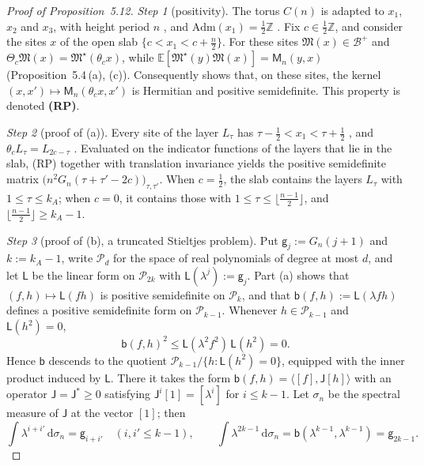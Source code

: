 \documentclass[11pt]{amsart}
\theoremstyle{definition}
\begin{document}
\begin{proof}[Proof of Proposition~5.12]
\emph{Step 1} (positivity).
The torus $C(n)$ is adapted to $x_1$, $x_2$ and $x_3$, with height period $n$ \cite[Section~1.1]{QEDII}, and $\mathrm{Adm}(x_1)=\frac12\mathbb Z$ \cite[Definition~2.2]{QEDII}.
Fix $c\in\frac12\mathbb Z$, and consider the sites $x$ of the open slab $\{c<x_1<c+\frac n2\}$.
For these sites $\mathfrak M(x)\in\mathcal B^+$ and $\Theta_c\mathfrak M(x)=\mathfrak M^\star(\theta_cx)$, while $\mathbb E[\mathfrak M^\star(y)\mathfrak M(x)]=\mathsf M_n(y,x)$ (Proposition~5.4\,(a), (c)).
Consequently \cite[Theorem~1.1\,(c)]{QEDII} shows that, on these sites, the kernel $(x,x')\mapsto\mathsf M_n(\theta_cx,x')$ is Hermitian and positive semidefinite.
This property is denoted \textbf{(RP)}.

\emph{Step 2} (proof of (a)).
Every site of the layer $L_\tau$ has $\tau-\frac12<x_1<\tau+\frac12$ \cite[Definition~2.4]{QEDII}, and $\theta_cL_\tau=L_{2c-\tau}$ \cite[Proposition~3.6\,(c)]{QEDII}.
Evaluated on the indicator functions of the layers that lie in the slab, (RP) together with translation invariance yields the positive semidefinite matrix $\bigl(n^2G_n(\tau+\tau'-2c)\bigr)_{\tau,\tau'}$.
When $c=\frac12$, the slab contains the layers $L_\tau$ with $1\le\tau\le k_A$; when $c=0$, it contains those with $1\le\tau\le\lfloor\frac{n-1}2\rfloor$, and $\lfloor\frac{n-1}2\rfloor\ge k_A-1$.

\emph{Step 3} (proof of (b), a truncated Stieltjes problem).
Put $\mathsf g_j:=G_n(j+1)$ and $k:=k_A-1$, write $\mathcal P_d$ for the space of real polynomials of degree at most $d$, and let $\mathsf L$ be the linear form on $\mathcal P_{2k}$ with $\mathsf L(\lambda^j):=\mathsf g_j$.
Part (a) shows that $(f,h)\mapsto\mathsf L(fh)$ is positive semidefinite on $\mathcal P_k$, and that $\mathsf b(f,h):=\mathsf L(\lambda fh)$ defines a positive semidefinite form on $\mathcal P_{k-1}$.
Whenever $h\in\mathcal P_{k-1}$ and $\mathsf L(h^2)=0$,
\begin{equation*}
\mathsf b(f,h)^2\le\mathsf L(\lambda^2f^2)\,\mathsf L(h^2)=0.
\end{equation*}
Hence $\mathsf b$ descends to the quotient $\mathcal P_{k-1}/\{h:\mathsf L(h^2)=0\}$, equipped with the inner product induced by $\mathsf L$.
There it takes the form $\mathsf b(f,h)=\langle[f],\mathsf J[h]\rangle$ with an operator $\mathsf J=\mathsf J^*\ge0$ satisfying $\mathsf J^i[1]=[\lambda^i]$ for $i\le k-1$.
Let $\sigma_n$ be the spectral measure of $\mathsf J$ at the vector $[1]$; then
\begin{equation*}
\int\lambda^{i+i'}\,\mathrm d\sigma_n=\mathsf g_{i+i'}\quad(i,i'\le k-1),\qquad\int\lambda^{2k-1}\,\mathrm d\sigma_n=\mathsf b(\lambda^{k-1},\lambda^{k-1})=\mathsf g_{2k-1}.
\end{equation*}


\end{proof}
\end{document}

